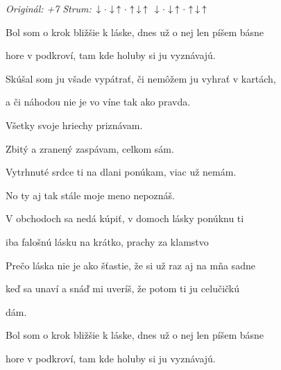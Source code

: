 \begin{song}


\begin{headerbox}
 \quad
\textit{Originál: +7} \quad
\textit{Strum:} $\Down\Miss\Down\Up\Miss\Up\Down\Up$ $\Down\Miss\Down\Up\Miss\Up\Down\Up$
\end{headerbox}

\begin{hchordbox}
\end{hchordbox}

\Large

\bigskip

Bol som o krok bližšie k láske, dnes už o nej len píšem básne \par
hore v podkroví, tam kde holuby si ju vyznávajú. \par
{}Skúšal som ju všade vypátrať, či nemôžem ju vyhrať v kartách, \par
a či náhodou nie je vo víne tak ako pravda. \par
{} 

\bigskip

\begin{chorusbox}{\Refren}
Všetky svoje hriechy priznávam. \par
{}Zbitý a zranený zaspávam, celkom sám. \par
Vytrhnuté srdce ti na dlani ponúkam, viac už nemám. \par
No ty aj tak stále moje meno nepoznáš. \par
\end{chorusbox}

\bigskip

V obchodoch sa nedá kúpiť, v domoch lásky ponúknu ti \par
iba falošnú lásku na krátko, prachy za klamstvo \par
Prečo láska nie je ako šťastie, že si už raz aj na mňa sadne \par
keď sa unaví a snáď mi uveríš, že potom ti ju celučičkú \par
{}dám.  \par

\bigskip

\Refren

\bigskip

Bol som o krok bližšie k láske, dnes už o nej len píšem básne \par
hore v podkroví, tam kde holuby si ju vyznávajú. \par

\bigskip

\Refren {}

\end{song}
